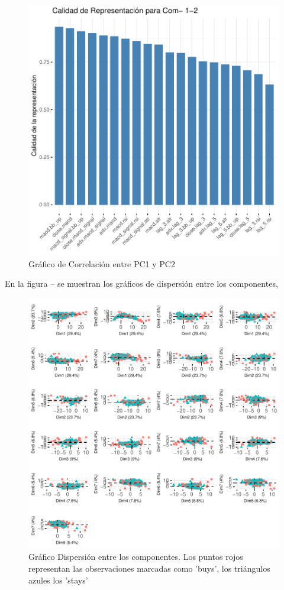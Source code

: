 \documentclass[a4paper,12pt]{Latex/Classes/PhDthesisPSnPDF}
\begin{document}
\begin{figure}[H]
\centering
\includegraphics{main-015}
\caption{Gráfico de Correlación entre PC1 y PC2}
\end{figure}

En la figura -- se muestran los gráficos de dispersión entre los componentes, 


\begin{figure}[H]
\centering
\includegraphics{main-017}
\caption{Gráfico Dispersión entre los componentes. Los puntos rojos representan las observaciones marcadas como 'buys', los triángulos azules los 'stays'}
\end{figure}
\end{document}
